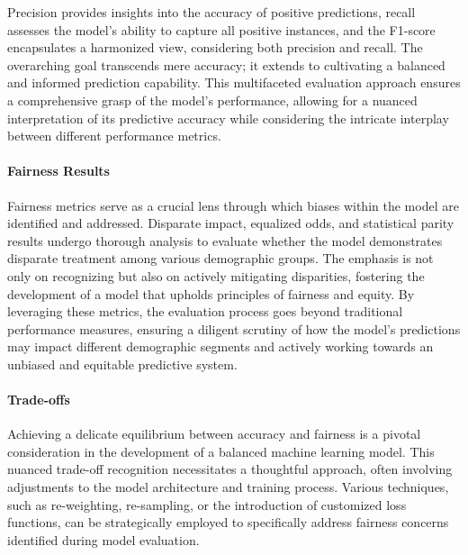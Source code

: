 Precision provides insights into the accuracy of positive predictions, recall assesses the model's ability to capture all positive instances, and the F1-score encapsulates a harmonized view, considering both precision and recall. The overarching goal transcends mere accuracy; it extends to cultivating a balanced and informed prediction capability. This multifaceted evaluation approach ensures a comprehensive grasp of the model's performance, allowing for a nuanced interpretation of its predictive accuracy while considering the intricate interplay between different performance metrics.

\paragraph{Fairness Results}

Fairness metrics serve as a crucial lens through which biases within the model are identified and addressed. Disparate impact, equalized odds, and statistical parity results undergo thorough analysis to evaluate whether the model demonstrates disparate treatment among various demographic groups. The emphasis is not only on recognizing but also on actively mitigating disparities, fostering the development of a model that upholds principles of fairness and equity. By leveraging these metrics, the evaluation process goes beyond traditional performance measures, ensuring a diligent scrutiny of how the model's predictions may impact different demographic segments and actively working towards an unbiased and equitable predictive system.

\paragraph{Trade-offs}

Achieving a delicate equilibrium between accuracy and fairness is a pivotal consideration in the development of a balanced machine learning model. This nuanced trade-off recognition necessitates a thoughtful approach, often involving adjustments to the model architecture and training process. Various techniques, such as re-weighting, re-sampling, or the introduction of customized loss functions, can be strategically employed to specifically address fairness concerns identified during model evaluation.

